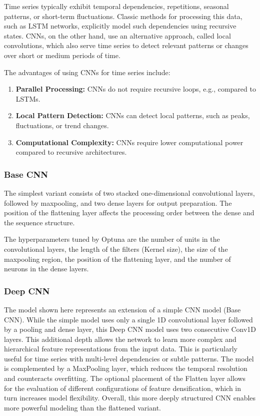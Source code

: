 Time series typically exhibit temporal dependencies, repetitions, seasonal patterns, or short-term fluctuations. Classic methods for processing this data, such as LSTM networks, explicitly model such dependencies using recursive states. CNNs, on the other hand, use an alternative approach, called local convolutions, which also serve time series to detect relevant patterns or changes over short or medium periods of time.

The advantages of using CNNs for time series include:

\begin{enumerate}
    \item \textbf{Parallel Processing:} CNNs do not require recursive loops, e.g., compared to LSTMs.
    \item \textbf{Local Pattern Detection:} CNNs can detect local patterns, such as peaks, fluctuations, or trend changes.
    \item \textbf{Computational Complexity:} CNNs require lower computational power compared to recursive architectures.
\end{enumerate}

\subsubsection{Base CNN}

The simplest variant consists of two stacked one-dimensional convolutional layers, followed by maxpooling, and two dense layers for output preparation. The position of the flattening layer affects the processing order between the dense and the sequence structure.

The hyperparameters tuned by Optuna are the number of units in the convolutional layers, the length of the filters (Kernel size), the size of the maxpooling region, the position of the flattening layer, and the number of neurons in the dense layers.



\subsubsection{Deep CNN}

The model shown here represents an extension of a simple CNN model (Base CNN). While the simple model uses only a single 1D convolutional layer followed by a pooling and dense layer, this Deep CNN model uses two consecutive Conv1D layers. This additional depth allows the network to learn more complex and hierarchical feature representations from the input data. This is particularly useful for time series with multi-level dependencies or subtle patterns. The model is complemented by a MaxPooling layer, which reduces the temporal resolution and counteracts overfitting. The optional placement of the Flatten layer allows for the evaluation of different configurations of feature densification, which in turn increases model flexibility. Overall, this more deeply structured CNN enables more powerful modeling than the flattened variant.

